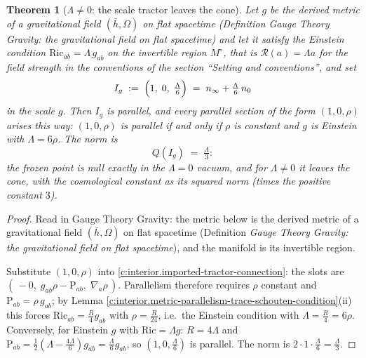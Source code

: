\documentclass[11pt]{article}
\newtheorem{theorem}{Theorem}[section]
\theoremstyle{definition}
\theoremstyle{plain}
\newcommand{\changedmark}[2]{\marginpar{\raggedright\scriptsize\color{#1}#2}}
\providecommand{\Ric}{}\renewcommand{\Ric}{\mathrm{Ric}}
\providecommand{\Sch}{}\renewcommand{\Sch}{\mathrm{P}}
\providecommand{\hb}{}\renewcommand{\hb}{\bar{h}}
\providecommand{\nInf}{}\renewcommand{\nInf}{n_\infty}
\providecommand{\nO}{}\renewcommand{\nO}{n_0}
\begin{document}
\begin{theorem}[$\Lambda \neq 0$: the scale tractor leaves the cone]\label{c:interior.scale-tractor-leaves-cone}
\changedmark{gray}{reworded}
Let $g$ be the derived metric of a gravitational field $(\hb, \Omega)$ on flat spacetime (Definition \emph{Gauge Theory Gravity: the gravitational field on flat spacetime}) and let it satisfy the Einstein condition $\Ric_{ab} = \Lambda\, g_{ab}$ on the invertible region $M^\circ$, that is $\mathcal{R}(a) = \Lambda a$ for the field strength in the conventions of the section ``Setting and conventions'', and set
\[
I_g \;:=\; \Bigl(1,\; 0,\; \tfrac{\Lambda}{6}\Bigr) \;=\; \nInf + \tfrac{\Lambda}{6}\,\nO
\]
in the scale $g$. Then $I_g$ is parallel, and every parallel section of the form $(1, 0, \rho)$ arises this way: $(1,0,\rho)$ is parallel if and only if $\rho$ is constant and $g$ is Einstein with $\Lambda = 6\rho$. The norm is
\[
Q(I_g) \;=\; \tfrac{\Lambda}{3} :
\]
the frozen point is null exactly in the $\Lambda = 0$ vacuum, and for $\Lambda \neq 0$ it leaves the cone, with the cosmological constant as its squared norm (times the positive constant $3$).
\end{theorem}
\begin{proof}
Read in Gauge Theory Gravity: the metric below is the derived metric of a gravitational field $(\hb, \Omega)$ on flat spacetime (Definition \emph{Gauge Theory Gravity: the gravitational field on flat spacetime}), and the manifold is its invertible region.

Substitute $(1, 0, \rho)$ into \ref{c:interior.imported-tractor-connection}: the slots are $(\,-0,\; g_{ab}\rho - \Sch_{ab},\; \nabla_a \rho\,)$. Parallelism therefore requires $\rho$ constant and $\Sch_{ab} = \rho\, g_{ab}$; by Lemma \ref{c:interior.metric-parallelism-trace-schouten-condition}(ii) this forces $\Ric_{ab} = \tfrac{R}{4}g_{ab}$ with $\rho = \tfrac{R}{24}$, i.e.\ the Einstein condition with $\Lambda = \tfrac{R}{4} = 6\rho$. Conversely, for Einstein $g$ with $\Ric = \Lambda g$: $R = 4\Lambda$ and $\Sch_{ab} = \tfrac12(\Lambda - \tfrac{4\Lambda}{6})g_{ab} = \tfrac{\Lambda}{6}g_{ab}$, so $(1, 0, \tfrac{\Lambda}{6})$ is parallel. The norm is $2 \cdot 1 \cdot \tfrac{\Lambda}{6} = \tfrac{\Lambda}{3}$.

\end{proof}
\end{document}
